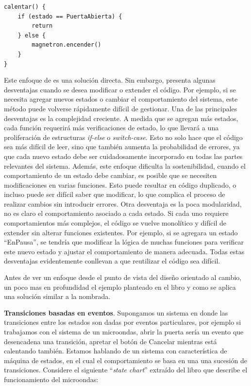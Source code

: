 \begin{lstlisting}
calentar() {
    if (estado == PuertaAbierta) {
        return
    } else {
        magnetron.encender()
    }
}
\end{lstlisting}

Este enfoque de es una solución directa. Sin embargo, presenta algunas desventajas cuando se desea modificar o extender el código. Por ejemplo, si se necesita agregar nuevos estados o cambiar el comportamiento del sistema, este método puede volverse rápidamente difícil de gestionar. Una de las principales desventajas es la complejidad creciente. A medida que se agregan más estados, cada función requerirá más verificaciones de estado, lo que llevará a una proliferación de estructuras \textit{if-else} o \textit{switch-case}. Esto no solo hace que el código sea más difícil de leer, sino que también aumenta la probabilidad de errores, ya que cada nuevo estado debe ser cuidadosamente incorporado en todas las partes relevantes del sistema. Además, este enfoque dificulta la sostenibilidad, cuando el comportamiento de un estado debe cambiar, es posible que se necesiten modificaciones en varias funciones. Esto puede resultar en código duplicado, o incluso puede ser difícil saber que modificar, lo que complica el proceso de realizar cambios sin introducir errores. Otra desventaja es la poca modularidad, no es claro el comportamiento asociado a cada estado. Si cada uno requiere comportamientos más complejos, el código se vuelve monolítico y difícil de extender sin alterar funciones existentes. Por ejemplo, si se agregara un estado ``EnPausa'', se tendría que modificar la lógica de muchas funciones para verificar este nuevo estado y ajustar el comportamiento de manera adecuada. Todas estas desventajas evidentemente conllevan a que reutilizar el código sea difícil.

Antes de ver un enfoque desde el punto de vista del diseño orientado al cambio, un poco mas en profundidad el ejemplo planteado en el libro y como se aplica una solución similar a la nombrada.

\textbf{Transiciones basadas en eventos}. Supongamos un sistema en donde las transiciones entre los estados son dadas por eventos particulares, por ejemplo si trabajamos con el sistema de un microondas, abrir la puerta sería un evento que desencadena una transición, apretar el botón de Cancelar mientras está calentando también. Estamos hablando de un sistema con característica de máquina de estados, en el cual el comportamiento se basa en una una sucesión de transiciones. Considere el siguiente ``\textit{state chart}'' extraído del libro que describe el funcionamiento del microondas:


